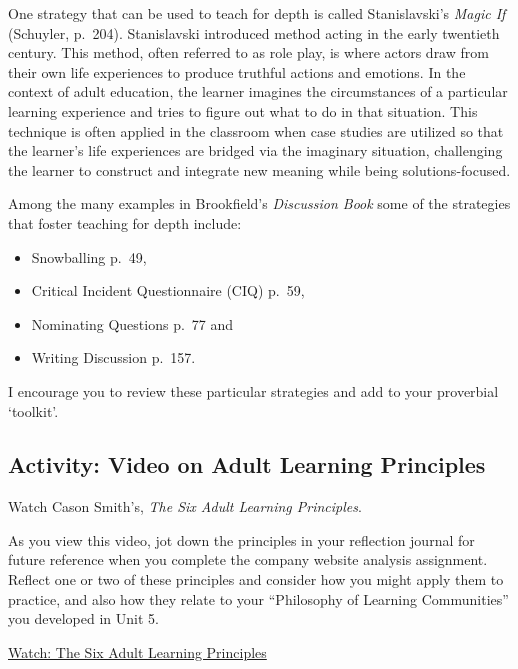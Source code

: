 \documentclass[
]{book}
\providecommand{\tightlist}{%
  \setlength{\itemsep}{0pt}\setlength{\parskip}{0pt}}
\begin{document}
One strategy that can be used to teach for depth is called
Stanislavski's \emph{Magic If} (Schuyler, p.~204). Stanislavski introduced
method acting in the early twentieth century. This method, often
referred to as role play, is where actors draw from their own life
experiences to produce truthful actions and emotions. In the context of
adult education, the learner imagines the circumstances of a particular
learning experience and tries to figure out what to do in that
situation. This technique is often applied in the classroom when case
studies are utilized so that the learner's life experiences are bridged
via the imaginary situation, challenging the learner to construct and
integrate new meaning while being solutions-focused.

Among the many examples in Brookfield's \emph{Discussion Book} some of the strategies that foster teaching for depth include:

\begin{itemize}
\tightlist
\item
  Snowballing p.~49,\\
\item
  Critical Incident Questionnaire (CIQ) p.~59,\\
\item
  Nominating Questions p.~77 and\\
\item
  Writing Discussion p.~157.
\end{itemize}

I encourage you to review these particular strategies and add to your proverbial `toolkit'.

\hypertarget{activity-video-on-adult-learning-principles}{%
\subsection*{Activity: Video on Adult Learning Principles}\label{activity-video-on-adult-learning-principles}}

\begin{reflect}
Watch Cason Smith's, \emph{The Six Adult Learning Principles}.

As you view this video, jot down the principles in your reflection
journal for future reference when you complete the company website
analysis assignment. Reflect one or two of these principles and consider
how you might apply them to practice, and also how they relate to your
``Philosophy of Learning Communities'' you developed in Unit 5.

\href{https://www.youtube.com/watch?v=vLJ7cRwKI-I}{Watch: The Six Adult
Learning Principles}
\end{reflect}
\end{document}
